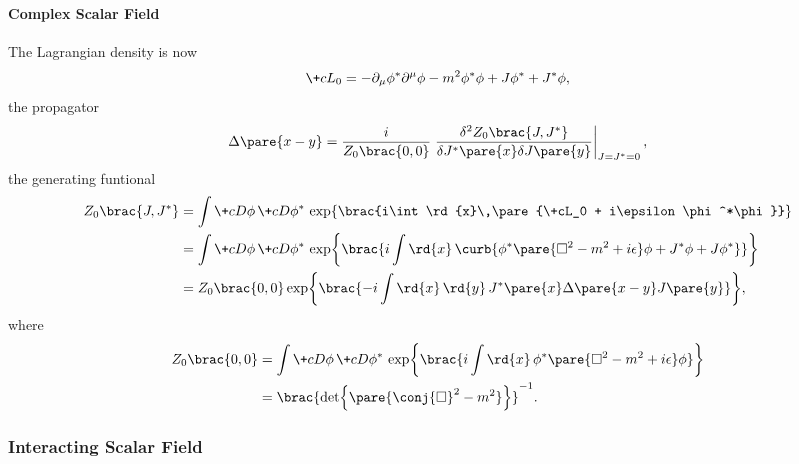 \documentclass[hidelinks]{article}
\begin{document}

\paragraph{Complex Scalar Field} %
\label{par:complex_scalar_field}

The Lagrangian density is now
\[ \+cL_0 = -\partial_\mu \phi^* \partial^\mu \phi - m^2\phi^*\phi + J\phi^* + J^*\phi, \]
the propagator
\[ \Delta\pare{x-y} = \frac{i}{Z_0\brac{0,0}}\left.\frac{\delta^2 Z_0\brac{J,J^*}}{\delta J^*\pare{x}\delta J\pare{y}}\right\vert_{J=J^* = 0}, \]
the generating funtional
\begin{align*}
    Z_0\brac{J,J^*} &= \int \+cD \phi \,\+cD \phi^*\, \exp\brac{i\int \rd{x}\,\pare{\+cL_0 + i\epsilon \phi^*\phi}} \\
    &= \int \+cD\phi\,\+cD\phi^*\, \exp\brac{i\int \rd{x}\,\curb{\phi^*\pare{\Box^2 - m^2 + i\epsilon}\phi + J^*\phi + J\phi^*}} \\
    &= Z_0\brac{0,0}\exp\brac{-i\int \rd{x}\,\rd{y}\, J^*\pare{x}\Delta\pare{x-y}J\pare{y}},
\end{align*}
where
\begin{align*}
    Z_0\brac{0,0} &= \int \+cD\phi \,\+cD\phi^* \,\exp\brac{i\int \rd{x}\, \phi^* \pare{\Box^2 - m^2 + i\epsilon}\phi} \\
    &= \brac{\det \pare{\conj{\Box}^2 - m^2}}^{-1}.
\end{align*}



\subsubsection{Interacting Scalar Field} %
\label{ssub:interacting_scalar_field}
\end{document}
